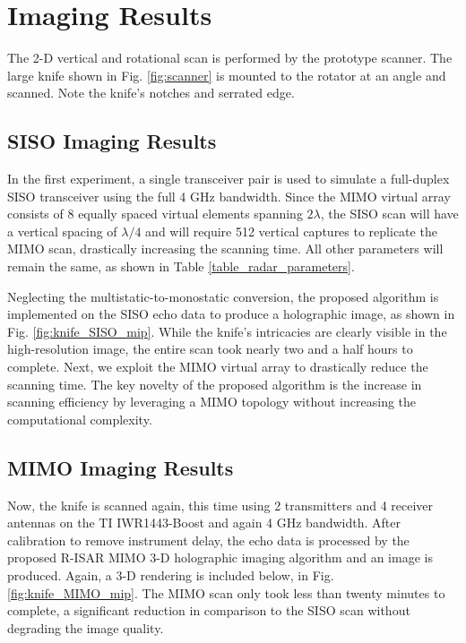 \documentclass[conference]{IEEEtran}
\begin{document}
		
		\section{Imaging Results}
		\label{sec:imaging_results}
		The 2-D vertical and rotational scan is performed by the prototype scanner. The large knife shown in Fig. \ref{fig:scanner} is mounted to the rotator at an angle and scanned. Note the knife's notches and serrated edge. 
		
		\subsection{SISO Imaging Results}
		
		In the first experiment, a single transceiver pair is used to simulate a full-duplex SISO transceiver using the full 4 GHz bandwidth. Since the MIMO virtual array consists of 8 equally spaced virtual elements spanning $2\lambda$, the SISO scan will have a vertical spacing of $\lambda/4$ and will require 512 vertical captures to replicate the MIMO scan, drastically increasing the scanning time. All other parameters will remain the same, as shown in Table \ref{table_radar_parameters}.
	
		Neglecting the multistatic-to-monostatic conversion, the proposed algorithm is implemented on the SISO echo data to produce a holographic image, as shown in Fig. \ref{fig:knife_SISO_mip}. While the knife's intricacies are clearly visible in the high-resolution image, the entire scan took nearly two and a half hours to complete. Next, we exploit the MIMO virtual array to drastically reduce the scanning time. The key novelty of the proposed algorithm is the increase in scanning efficiency by leveraging a MIMO topology without increasing the computational complexity.
		
		\subsection{MIMO Imaging Results}
		
		Now, the knife is scanned again, this time using 2 transmitters and 4 receiver antennas on the TI IWR1443-Boost and again 4 GHz bandwidth. After calibration to remove instrument delay, the echo data is processed by the proposed R-ISAR MIMO 3-D holographic imaging algorithm and an image is produced. Again, a 3-D rendering is included below, in Fig. \ref{fig:knife_MIMO_mip}. The MIMO scan only took less than twenty minutes to complete, a significant reduction in comparison to the SISO scan without degrading the image quality.
		
\end{document}

